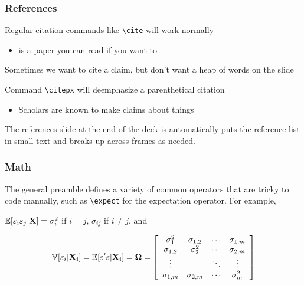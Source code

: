 \documentclass[aspectratio=169,handout]{beamer}
\begin{document}
\begin{frame}
	\frametitle{References}
	\begin{witem}
		\item Regular citation commands like \texttt{\textbackslash{}cite} will work normally
			\begin{itemize}
				\item \cite{DuquetteJMP} is a paper you can read if you want to
			\end{itemize}
		\item Sometimes we want to cite a claim, but don't want a heap of words on the slide
		\item Command \texttt{\textbackslash{}citepx} will deemphasize a parenthetical citation
			\begin{itemize}
				\item Scholars are known to make claims about things 
			\end{itemize}
		\item The references slide at the end of the deck is automatically puts the reference list
			in small text and breaks up across frames as needed.
	\end{witem}
\end{frame}

	

\begin{frame}
	\frametitle{Math}
	\begin{witem}
	\item The general preamble defines a variety of common operators that are tricky to 
		code manually, such as \texttt{\textbackslash{}expect} for the expectation operator. For example,
		
	\item
	 $\mathbb{E}[\varepsilon_i \varepsilon_j|\mathbf{X}] = \sigma_i^2$ if $i=j$, $\sigma_{ij}$ if $i \neq j$, and
	
		\begin{equation*}
		\mathbb{V}[\varepsilon_i|\mathbf{X_{i}}] 
		=\mathbb{E}[\varepsilon^\prime \varepsilon | \mathbf{X_{i}}] 
		= \boldsymbol{\Omega}
		= \left[
		\begin{array}{cccc}
			\sigma_1^2 		& \sigma_{1,2}	&	\cdots 	& \sigma_{1,m} 		\\
			\sigma_{1,2}		& \sigma_2^2 	&	\cdots 	& \sigma_{2,m} 		\\
			\vdots			&				&	\ddots	& \vdots				\\
			\sigma_{1,m}		& \sigma_{2,m}	&	\cdots 	& \sigma_m^2  
		\end{array} \right]
		\end{equation*}
	\end{witem}
\end{frame}
\end{document}
